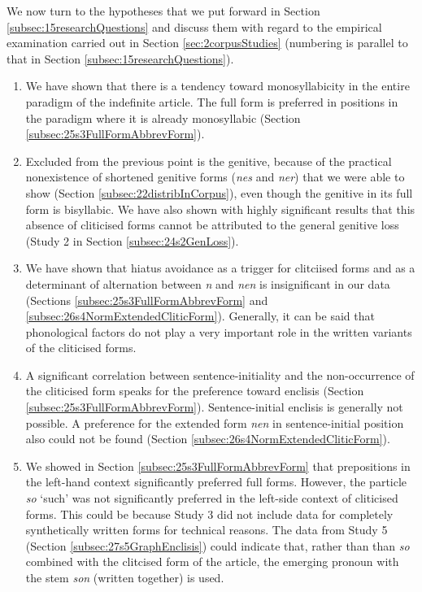We now turn to the hypotheses that we put forward in Section \ref{subsec:15researchQuestions} and discuss them with regard to the empirical examination carried out in Section \ref{sec:2corpusStudies} (numbering is parallel to that in Section \ref{subsec:15researchQuestions}).

\begin{enumerate}
	\item We have shown that there is a tendency toward monosyllabicity in the entire paradigm of the indefinite article.
	The full form is preferred in positions in the paradigm where it is already monosyllabic (Section \ref{subsec:25s3FullFormAbbrevForm}).
	\item Excluded from the previous point is the genitive, because of the practical nonexistence of shortened genitive forms (\textit{nes} and \textit{ner}) that we were able to show (Section \ref{subsec:22distribInCorpus}), even though the genitive in its full form is bisyllabic.
	We have also shown with highly significant results that this absence of cliticised forms cannot be attributed to the general genitive loss (Study 2 in Section \ref{subsec:24s2GenLoss}).
	\item We have shown that hiatus avoidance as a trigger for clitciised forms and as a determinant of alternation between \textit{n} and \textit{nen} is insignificant in our data (Sections \ref{subsec:25s3FullFormAbbrevForm} and \ref{subsec:26s4NormExtendedCliticForm}).
	Generally, it can be said that phonological factors do not play a very important role in the written variants of the cliticised forms.
	\item A significant correlation between sentence-initiality and the non-occurrence of the cliticised form speaks for the preference toward enclisis (Section \ref{subsec:25s3FullFormAbbrevForm}).
	Sentence-initial enclisis is generally not possible.
	A preference for the extended form \textit{nen} in sentence-initial position also could not be found (Section \ref{subsec:26s4NormExtendedCliticForm}).
	\item We showed in Section \ref{subsec:25s3FullFormAbbrevForm} that prepositions in the left-hand context significantly preferred full forms.
	However, the particle \textit{so} `such' was not significantly preferred in the left-side context of cliticised forms.
	This could be because Study 3 did not include data for completely synthetically written forms for technical reasons.
	The data from Study 5 (Section \ref{subsec:27s5GraphEnclisis}) could indicate that, rather than than \textit{so} combined with the clitcised form of the article, the emerging pronoun with the stem \textit{son} (written together) is used.

\end{enumerate}
